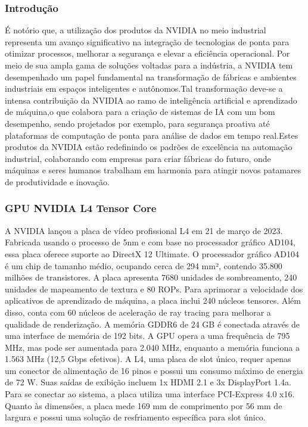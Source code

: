 \documentclass[conference]{IEEEtran}
\begin{document}
\subsubsection{Introdução}
\par É notório que, a utilização dos produtos da NVIDIA no meio industrial representa um avanço significativo na integração de tecnologias de ponta para otimizar processos, melhorar a segurança e elevar a eficiência operacional. Por meio de sua ampla gama de soluções voltadas para a indústria, a NVIDIA tem desempenhado um papel fundamental na transformação de fábricas e ambientes industriais em espaços inteligentes e autônomos.Tal transformação deve-se a intensa contribuição da NVIDIA ao ramo de inteligência artificial e aprendizado de máquina,o que colabora para a criação de sistemas de IA com um bom desempenho, sendo projetados por exemplo, para segurança proativa até plataformas de computação de ponta para análise de dados em tempo real.Estes produtos da NVIDIA estão redefinindo os padrões de excelência na automação industrial, colaborando com empresas para criar fábricas do futuro, onde máquinas e seres humanos trabalham em harmonia para atingir novos patamares de produtividade e inovação.

\subsubsection{GPU NVIDIA L4 Tensor Core}

\par A NVIDIA lançou a placa de vídeo profissional L4 em 21 de março de 2023. Fabricada usando o processo de 5nm e com base no processador gráfico AD104, essa placa oferece suporte ao DirectX 12 Ultimate. O processador gráfico AD104 é um chip de tamanho médio, ocupando cerca de 294 mm², contendo 35.800 milhões de transistores. A placa apresenta 7680 unidades de sombreamento, 240 unidades de mapeamento de textura e 80 ROPs.
Para aprimorar a velocidade dos aplicativos de aprendizado de máquina, a placa inclui 240 núcleos tensores. Além disso, conta com 60 núcleos de aceleração de ray tracing para melhorar a qualidade de renderização. A memória GDDR6 de 24 GB é conectada através de uma interface de memória de 192 bits. A GPU opera a uma frequência de 795 MHz, mas pode ser aumentada para 2.040 MHz, enquanto a memória funciona a 1.563 MHz (12,5 Gbps efetivos).
A L4, uma placa de slot único, requer apenas um conector de alimentação de 16 pinos e possui um consumo máximo de energia de 72 W. Suas saídas de exibição incluem 1x HDMI 2.1 e 3x DisplayPort 1.4a. Para se conectar ao sistema, a placa utiliza uma interface PCI-Express 4.0 x16. Quanto às dimensões, a placa mede 169 mm de comprimento por 56 mm de largura e possui uma solução de resfriamento específica para slot único. 
\end{document}
